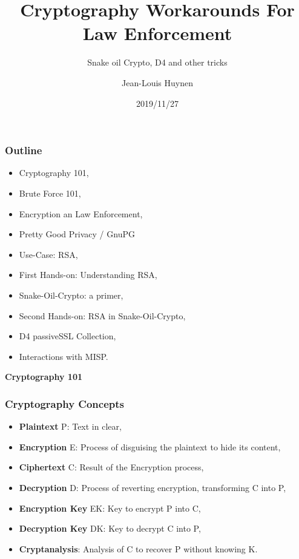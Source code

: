 \documentclass{beamer}
\title{Cryptography Workarounds For Law Enforcement}
\subtitle{Snake oil Crypto, D4 and other tricks}
\author{Jean-Louis Huynen}
\institute{Team CIRCL \\ }
\date{2019/11/27}
\begin{document}
\begin{frame}
    \maketitle
\end{frame}

\begin{frame}
        \frametitle{Outline}

        \begin{itemize}
          \item Cryptography 101,
          \item Brute Force 101,
          \item Encryption an Law Enforcement,
          \item Pretty Good Privacy / GnuPG
          \item Use-Case: RSA,
          \item First Hands-on: Understanding RSA,
          \item Snake-Oil-Crypto: a primer,
          \item Second Hands-on: RSA in Snake-Oil-Crypto,
          \item D4 passiveSSL Collection,
          \item Interactions with MISP.
        \end{itemize}

\end{frame}

\begin{frame}
  \begin{center}
    {\bf Cryptography 101}
  \end{center}
\end{frame}


\begin{frame}
  \frametitle{Cryptography Concepts}
        \begin{itemize}
          \item {\bf Plaintext} P: Text in clear,
          \item {\bf Encryption} E: Process of disguising the plaintext to hide its content,
          \item {\bf Ciphertext} C: Result of the Encryption process,
          \item {\bf Decryption} D: Process of reverting encryption, transforming C
            into P,
          \item {\bf Encryption Key} EK: Key to encrypt P into C,
          \item {\bf Decryption Key} DK: Key to decrypt C into P,
          \item {\bf Cryptanalysis}: Analysis of C to recover P without knowing K.
        \end{itemize}

\end{frame}
\end{document}
